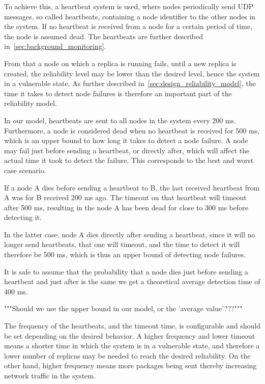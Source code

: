\documentclass{cslthse-msc}
\begin{document}
To achieve this, a heartbeat system is used, where nodes periodically send UDP messages, so called heartbeats, containing a node identifier to the other nodes in the system. If no heartbeat is received from a node for a certain period of time, the node is assumed dead. The heartbeats are further described in~\cref{sec:background_monitoring}.

From that a node on which a replica is running fails, until a new replica is created, the reliability level may be lower than the desired level, hence the system in a vulnerable state. As further described in~\cref{sec:design_reliability_model}, the time it takes to detect node failures is therefore an important part of the reliability model.

In our model, heartbeats are sent to all nodes in the system every 200 ms. Furthermore, a node is considered dead when no heartbeat is received for 500 ms, which is an upper bound to how long it takes to detect a node failure. A node may fail just before sending a heartbeat, or directly after, which will affect the actual time it took to detect the failure. This corresponds to the best and worst case scenario. 

If a node A dies before sending a heartbeat to B, the last received heartbeat from A was for B received 200 ms ago. The timeout on that heartbeat will timeout after 500 ms, resulting in the node A has been dead for close to 300 ms before detecting it. 

In the latter case, node A dies directly after sending a heartbeat, since it will no longer send heartbeats, that one will timeout, and the time to detect it will therefore be 500 ms, which is thus an upper bound of detecting node failures.

It is safe to assume that the probability that a node dies just before sending a heartbeat and just after is the same we get a theoretical average detection time of 400 ms.

"""Should we use the upper bound in our model, or the 'average value'???"""

The frequency of the heartbeats, and the timeout time, is configurable and should be set depending on the desired behavior. A higher frequency and lower timeout means a shorter time in which the system is in a vulnerable state, and therefore a lower number of replicas may be needed to reach the desired reliability. On the other hand, higher frequency means more packages being sent thereby increasing network traffic in the system.
\end{document}
